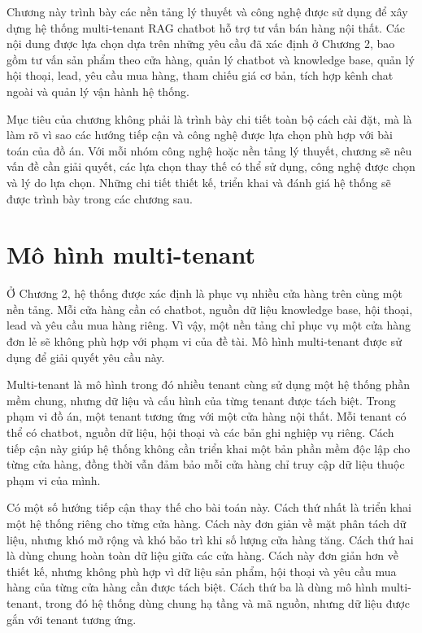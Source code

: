 \documentclass[../DoAn.tex]{subfiles}
\begin{document}
Chương này trình bày các nền tảng lý thuyết và công nghệ được sử dụng để xây dựng hệ thống multi-tenant RAG chatbot hỗ trợ tư vấn bán hàng nội thất. Các nội dung được lựa chọn dựa trên những yêu cầu đã xác định ở Chương 2, bao gồm tư vấn sản phẩm theo cửa hàng, quản lý chatbot và knowledge base, quản lý hội thoại, lead, yêu cầu mua hàng, tham chiếu giá cơ bản, tích hợp kênh chat ngoài và quản lý vận hành hệ thống.

Mục tiêu của chương không phải là trình bày chi tiết toàn bộ cách cài đặt, mà là làm rõ vì sao các hướng tiếp cận và công nghệ được lựa chọn phù hợp với bài toán của đồ án. Với mỗi nhóm công nghệ hoặc nền tảng lý thuyết, chương sẽ nêu vấn đề cần giải quyết, các lựa chọn thay thế có thể sử dụng, công nghệ được chọn và lý do lựa chọn. Những chi tiết thiết kế, triển khai và đánh giá hệ thống sẽ được trình bày trong các chương sau.

\section{Mô hình multi-tenant}
\label{section:3.1}

Ở Chương 2, hệ thống được xác định là phục vụ nhiều cửa hàng trên cùng một nền tảng. Mỗi cửa hàng cần có chatbot, nguồn dữ liệu knowledge base, hội thoại, lead và yêu cầu mua hàng riêng. Vì vậy, một nền tảng chỉ phục vụ một cửa hàng đơn lẻ sẽ không phù hợp với phạm vi của đề tài. Mô hình multi-tenant được sử dụng để giải quyết yêu cầu này.

Multi-tenant là mô hình trong đó nhiều tenant cùng sử dụng một hệ thống phần mềm chung, nhưng dữ liệu và cấu hình của từng tenant được tách biệt. Trong phạm vi đồ án, một tenant tương ứng với một cửa hàng nội thất. Mỗi tenant có thể có chatbot, nguồn dữ liệu, hội thoại và các bản ghi nghiệp vụ riêng. Cách tiếp cận này giúp hệ thống không cần triển khai một bản phần mềm độc lập cho từng cửa hàng, đồng thời vẫn đảm bảo mỗi cửa hàng chỉ truy cập dữ liệu thuộc phạm vi của mình.

Có một số hướng tiếp cận thay thế cho bài toán này. Cách thứ nhất là triển khai một hệ thống riêng cho từng cửa hàng. Cách này đơn giản về mặt phân tách dữ liệu, nhưng khó mở rộng và khó bảo trì khi số lượng cửa hàng tăng. Cách thứ hai là dùng chung hoàn toàn dữ liệu giữa các cửa hàng. Cách này đơn giản hơn về thiết kế, nhưng không phù hợp vì dữ liệu sản phẩm, hội thoại và yêu cầu mua hàng của từng cửa hàng cần được tách biệt. Cách thứ ba là dùng mô hình multi-tenant, trong đó hệ thống dùng chung hạ tầng và mã nguồn, nhưng dữ liệu được gắn với tenant tương ứng.
\end{document}
